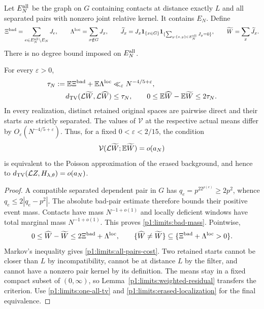 Let $E_N^{\rm all}$ be the graph on $G$ containing contacts
at distance exactly $L$ and all separated pairs with nonzero
joint relative kernel.  It contains $E_N$.  Define
\[
 \Xi^{\rm bad}=\sum_{e\in E_N^{\rm all}\setminus E_N}J_e,\qquad
 \Lambda^{\rm loc}=\sum_{x\notin G}J_x,\qquad
 \widetilde J_x=J_x\mathbf 1_{\{x\in G\}}
       \mathbf 1_{\{\sum_{y:\{x,y\}\in E_N^{\rm all}}J_y=0\}},\qquad
 \widetilde W=\sum_x\widetilde J_x.
\]
There is no degree bound imposed on $E_N^{\rm all}$.

\begin{proposition}
\label{p1:limits:all-pairs}
For every $\varepsilon>0$,
\begin{align}
 \tau_N:=\mathbb E\Xi^{\rm bad}+\mathbb E\Lambda^{\rm loc}
       &\ll_\varepsilon N^{-4/5+\varepsilon},
       \label{p1:limits:bad-mass}\\
 d_{\mathrm{TV}}(\mathcal L\widetilde W,\mathcal L\widehat W)&\le\tau_N,\qquad
 0\le\mathbb E\widehat W-\mathbb E\widetilde W\le2\tau_N.
       \label{p1:limits:all-pairs-cost}
\end{align}
In every realization, distinct retained original spaces are
pairwise direct and their starts are strictly separated.
The values of $\mathcal V$ at the respective actual means differ
by $O_\varepsilon(N^{-4/5+\varepsilon})$.  Thus, for a fixed
$0<\varepsilon<2/15$, the condition
\[
 \mathcal V(\mathcal L\widetilde W;\mathbb E\widetilde W)=o(a_N)
\]
is equivalent to the Poisson approximation of the erased
background, and hence to
$d_{\mathrm{TV}}(\mathcal L Z,H_{\lambda,\theta})=o(a_N)$.
\end{proposition}
\begin{proof}
A compatible separated dependent pair in $G$ has
$q_e=p^22^{\rho(e)}\ge2p^2$, whence
$q_e\le2|q_e-p^2|$.  The absolute bad-pair estimate therefore
bounds their positive event mass.  Contacts have mass
$N^{-1+o(1)}$ and locally deficient windows have total marginal
mass $N^{-1+o(1)}$.  This proves \eqref{p1:limits:bad-mass}.
Pointwise,
\[
 0\le\widehat W-\widetilde W
       \le2\Xi^{\rm bad}+\Lambda^{\rm loc},\qquad
 \{\widehat W\ne\widetilde W\}
       \subseteq\{\Xi^{\rm bad}+\Lambda^{\rm loc}>0\}.
\]
Markov's inequality gives \eqref{p1:limits:all-pairs-cost}.
Two retained starts cannot be closer than $L$ by incompatibility,
cannot be at distance $L$ by the filter, and cannot have a
nonzero pair kernel by its definition.  The means stay in a
fixed compact subset of $(0,\infty)$, so
Lemma~\ref{p1:limits:weighted-residual} transfers the criterion.
Use \eqref{p1:limits:one-all-tv} and
\eqref{p1:limits:erased-localization} for the final equivalence.
\end{proof}

